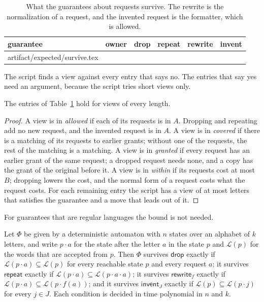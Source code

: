 \documentclass[acmsmall,nonacm,screen]{acmart}
\makeatletter
\newcommand{\kw}[1]{\mathsf{#1}}
\newcommand{\drop}{\kw{drop}}
\newcommand{\rep}{\kw{repeat}}
\newcommand{\rew}[1]{\kw{rewrite}_{#1}}
\newcommand{\inv}[1]{\kw{invent}_{#1}}
\newcommand{\rows}[1]{\@@input artifact/expected/#1.tex }
\makeatother
\begin{document}
\begin{table}
\caption{What the guarantees about requests survive. The rewrite is the normalization of a
request, and the invented request is the formatter, which is allowed.}
\label{tab:survive}
\begin{tabular}{llcccc}
\toprule
guarantee & owner & drop & repeat & rewrite & invent \\
\midrule
\rows{survive}
\bottomrule
\end{tabular}
\end{table}

The script finds a view against every entry that says no. The entries that say yes need an
argument, because the script tries short views only.

\begin{lemma}
\label{lem:table}
The entries of Table~\ref{tab:survive} hold for views of every length.
\end{lemma}

\begin{proof}
A view is in \emph{allowed} if each of its requests is in $A$. Dropping and repeating add no
new request, and the invented request is in $A$. A view is in \emph{covered} if there is a
matching of its requests to earlier grants; without one of the requests, the rest of the
matching is a matching. A view is in \emph{granted} if every request has an earlier grant of
the same request; a dropped request needs none, and a copy has the grant of the original
before it. A view is in \emph{within} if its requests cost at most $B$; dropping lowers the
cost, and the normal form of a request costs what the request costs. For each remaining entry
the script has a view of at most \exStreamLength{} letters that satisfies the guarantee and a
move that leads out of it.
\end{proof}

For guarantees that are regular languages the bound is not needed.

\begin{proposition}
\label{prop:decide}
Let $\Phi$ be given by a deterministic automaton with $n$ states over an alphabet of $k$
letters, and write $p \cdot a$ for the state after the letter $a$ in the state $p$ and
$\mathcal{L}(p)$ for the words that are accepted from $p$. Then $\Phi$ survives $\drop$ exactly
if $\mathcal{L}(p \cdot a) \subseteq \mathcal{L}(p)$ for every reachable state $p$ and every
request $a$; it survives $\rep$ exactly if $\mathcal{L}(p \cdot a) \subseteq \mathcal{L}(p
\cdot a \cdot a)$; it survives $\rew{f}$ exactly if $\mathcal{L}(p \cdot a) \subseteq
\mathcal{L}(p \cdot f(a))$; and it survives $\inv{J}$ exactly if $\mathcal{L}(p) \subseteq
\mathcal{L}(p \cdot j)$ for every $j \in J$. Each condition is decided in time polynomial in
$n$ and $k$.
\end{proposition}
\end{document}
